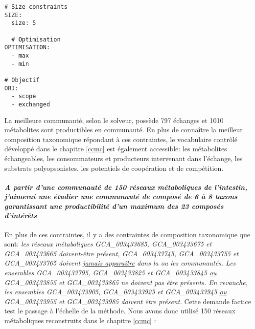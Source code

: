 \documentclass[../main.tex]{subfiles}
\begin{document}
\begin{lstlisting}[style=yaml]
# Size constraints
SIZE:
  size: 5
  
  # Optimisation
OPTIMISATION: 
  - max
  - min

# Objectif
OBJ:
  - scope
  - exchanged
\end{lstlisting}

La meilleure communauté, selon le solveur, possède 797 échanges et 1010 métabolites sont productibles en communauté. En plus de connaître la meilleur composition taxonomique répondant à ces contraintes, le vocabulaire contrôlé développé dans le chapitre \ref{ccmc} est également accessible: les métabolites échangeables, les consommateurs et producteurs intervenant dans l'échange, les substrats polyopsonistes, les potentiels de coopération et de compétition.



\paragraph*{\textit{A partir d'une communauté de 150 réseaux métaboliques de l'intestin, j'aimerai une étudier une communauté de composé de 6 à 8 taxons garantissant une productibilité d'un maximum des 23 composés d'intérêts}}
En plus de ces contraintes, il y a des contraintes de composition taxonomique que sont: \textit{les réseaux métaboliques GCA\_003433685, GCA\_003433675 et GCA\_003433665 doivent-être \underline{présent}, GCA\_003433745, GCA\_003433755 et GCA\_003433765 doivent \underline{jamais apparaître} dans la ou les communautés. Les ensembles GCA\_003433795, GCA\_003433825 et GCA\_003433845 \underline{ou} GCA\_003433855 et GCA\_003433865 ne doivent pas être présents. En revanche, les ensembles GCA\_003433905, GCA\_003433925 et GCA\_003433945 \underline{ou} GCA\_003433955 et GCA\_003433985 doivent être présent.} Cette demande factice test le passage à l'échelle de la méthode. Nous avons donc utilisé 150 réseaux métaboliques reconstruits dans le chapitre \ref{ccmc} :\\
\end{document}
